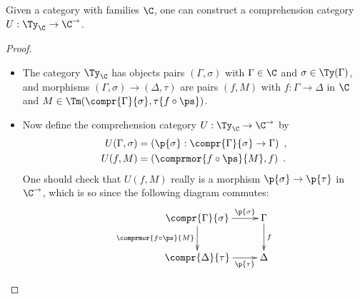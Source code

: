 \documentclass{article}
\begin{document}
\begin{theorem} \label{thm:comprcat}
  Given a category with families $\C$, one can construct a comprehension category $U :
  \Ty_{\C} \to \C^{\rightarrow}$.
\end{theorem}
\begin{proof} \mbox{}
  \begin{itemize}
  \item The category $\Ty_{\C}$ has objects pairs $(\Gamma, \sigma)$
    with $\Gamma \in \C$ and $\sigma \in \Ty(\Gamma)$, and morphisms
    $(\Gamma, \sigma) \to (\Delta, \tau)$ are pairs $(f, M)$ with $f :
    \Gamma \to \Delta$ in $\C$ and ${M \in \Tm(\compr{\Gamma}{\sigma},
      \tau\{f \circ \ps\})}$.

  \item Now define the comprehension category $U : \Ty_{\C} \to
    \C^{\rightarrow}$ by
  \begin{align*}
  U(\Gamma, \sigma) &= (\p{\sigma} : \compr{\Gamma}{\sigma} \to \Gamma) \enspace ,\\
  U(f, M) &= (\comprmor{f \circ \ps}{M}, f) \enspace .
  \end{align*}
  One should check that $U(f, M)$ really is a morphism $\p{\sigma} \to
  \p{\tau}$ in $\C^{\rightarrow}$, which is so since the following
  diagram commutes:
\[
\xymatrix{
\compr{\Gamma}{\sigma} \ar^-{\p{\sigma}}[r] \ar_-{\comprmor{f \circ \ps}{M}}[d] & \Gamma \ar^-{f}[d] \\
\compr{\Delta}{\tau} \ar_-{\p{\tau}}[r] & \Delta
}
\]


\end{itemize}
\end{proof}
\end{document}
